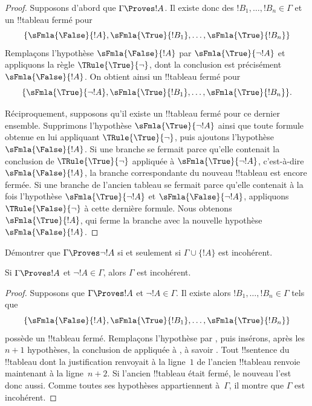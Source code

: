 \documentclass[11pt,a4paper,openany]{memoir}
\begin{document}
\begin{proof}
Supposons d'abord que $\Gamma \Proves !A$. Il existe donc des
$!B_1,\dots,!B_n \in \Gamma$ et un !!{tableau} fermé pour
\[
\{\sFmla{\False}{!A},
\sFmla{\True}{!B_1}, \dots, \sFmla{\True}{!B_n}\}
\]
Remplaçons l'hypothèse $\sFmla{\False}{!A}$ par
$\sFmla{\True}{\lnot !A}$ et appliquons la règle
$\TRule{\True}{\lnot}$, dont la conclusion est précisément
$\sFmla{\False}{!A}$. On obtient ainsi un !!{tableau} fermé pour
\[
\{\sFmla{\True}{\lnot !A},
\sFmla{\True}{!B_1}, \dots, \sFmla{\True}{!B_n}\}.
\]

Réciproquement, supposons qu'il existe un !!{tableau} fermé pour ce
dernier ensemble. Supprimons l'hypothèse
$\sFmla{\True}{\lnot !A}$ ainsi que toute formule obtenue en lui
appliquant $\TRule{\True}{\lnot}$, puis ajoutons l'hypothèse
$\sFmla{\False}{!A}$. Si une branche se fermait parce qu'elle contenait
la conclusion de $\TRule{\True}{\lnot}$ appliquée à
$\sFmla{\True}{\lnot !A}$, c'est-à-dire
$\sFmla{\False}{!A}$, la branche correspondante du nouveau
!!{tableau} est encore fermée. Si une branche de l'ancien tableau se
fermait parce qu'elle contenait à la fois l'hypothèse
$\sFmla{\True}{\lnot !A}$ et $\sFmla{\False}{\lnot !A}$, appliquons
$\TRule{\False}{\lnot}$ à cette dernière formule. Nous obtenons
$\sFmla{\True}{!A}$, qui ferme la branche avec la nouvelle hypothèse
$\sFmla{\False}{!A}$.
\end{proof}

\begin{prob}
Démontrer que $\Gamma \Proves \lnot !A$ si et seulement si
$\Gamma \cup \{!A\}$ est incohérent.
\end{prob}

\begin{prop}
  Si $\Gamma \Proves !A$ et $\lnot !A \in \Gamma$, alors
  $\Gamma$ est incohérent.
\end{prop}

\begin{proof}
  Supposons que $\Gamma \Proves !A$ et $\lnot !A \in \Gamma$.
  Il existe alors $!B_1, \dots, !B_n \in \Gamma$ tels que
  \[
  \{\sFmla{\False}{!A}, \sFmla{\True}{!B_1}, \dots, \sFmla{\True}{!B_n}\}
  \]
  possède un !!{tableau} fermé. Remplaçons l'hypothèse
   par , puis insérons,
  après les $n+1$ hypothèses, la conclusion de
  \TRule{\True}{\lnot} appliquée à , à savoir
  . Tout !!{sentence} du !!{tableau} dont la
  justification renvoyait à la ligne~$1$ de l'ancien !!{tableau}
  renvoie maintenant à la ligne~$n+2$. Si l'ancien !!{tableau} était
  fermé, le nouveau l'est donc aussi. Comme toutes ses hypothèses
  appartiennent à~$\Gamma$, il montre que $\Gamma$ est incohérent.
\end{proof}
\end{document}

